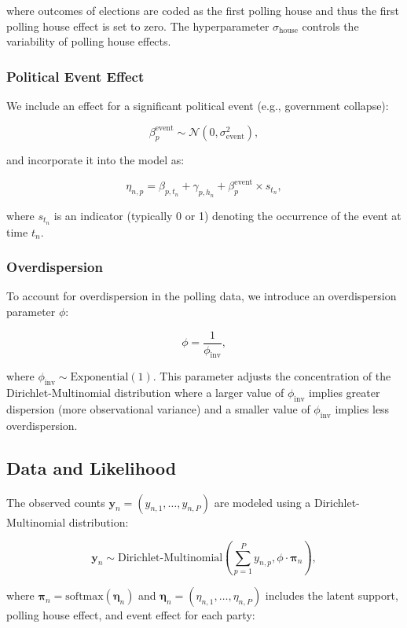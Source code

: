 \documentclass[
  letterpaper,
  DIV=11,
  numbers=noendperiod]{scrartcl}
\begin{document}
where outcomes of elections are coded as the first polling house and
thus the first polling house effect is set to zero. The hyperparameter
\(\sigma_{\text{house}}\) controls the variability of polling house
effects.

\subsubsection{Political Event Effect}\label{political-event-effect}

We include an effect for a significant political event (e.g., government
collapse):

\[
\beta^{\text{event}}_p \sim \mathcal{N}\left(0, \sigma_{\text{event}}^2\right),
\]

and incorporate it into the model as:

\[
\eta_{n,p} = \beta_{p, t_n} + \gamma_{p, h_n} + \beta^{\text{event}}_p \times s_{t_n},
\]

where \(s_{t_n}\) is an indicator (typically 0 or 1) denoting the
occurrence of the event at time \(t_n\).

\subsubsection{Overdispersion}\label{overdispersion}

To account for overdispersion in the polling data, we introduce an
overdispersion parameter \(\phi\):

\[
\phi = \frac{1}{\phi_{\text{inv}}},
\]

where \(\phi_{\text{inv}} \sim \text{Exponential}(1)\). This parameter
adjusts the concentration of the Dirichlet-Multinomial distribution
where a larger value of \(\phi_{\text{inv}}\) implies greater dispersion
(more observational variance) and a smaller value of
\(\phi_{\text{inv}}\) implies less overdispersion.

\subsection{Data and Likelihood}\label{data-and-likelihood}

The observed counts
\(\mathbf{y}_{n} = \left(y_{n,1}, \dots, y_{n,P}\right)\) are modeled
using a Dirichlet-Multinomial distribution:

\[
\mathbf{y}_{n} \sim \text{Dirichlet-Multinomial}\left(\sum_{p=1}^P y_{n,p}, \phi \cdot \boldsymbol{\pi}_{n}\right),
\]

where
\(\boldsymbol{\pi}_{n} = \text{softmax}\left(\boldsymbol{\eta}_{n}\right)\)
and
\(\boldsymbol{\eta}_{n} = \left(\eta_{n,1}, \dots, \eta_{n,P}\right)\)
includes the latent support, polling house effect, and event effect for
each party:
\end{document}
